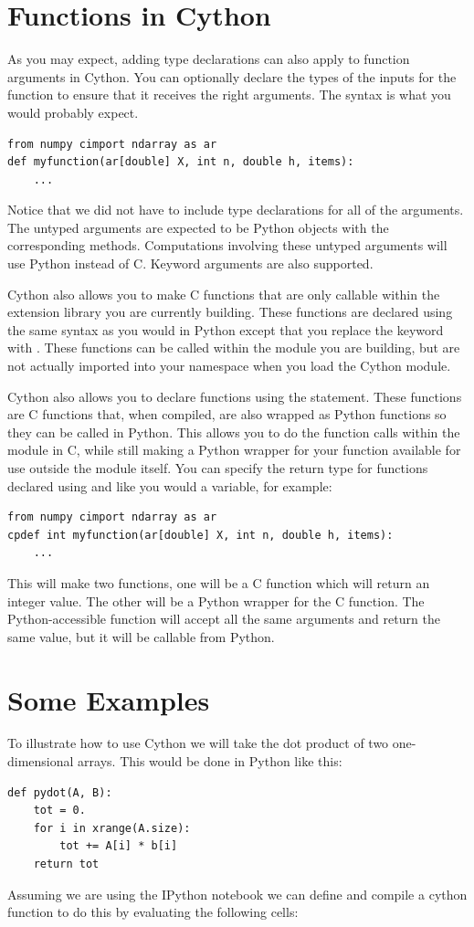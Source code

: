 \section*{Functions in Cython}
As you may expect, adding type declarations can also apply to function arguments in Cython.
You can optionally declare the types of the inputs for the function to ensure that it receives the right arguments.
The syntax is what you would probably expect.
\begin{lstlisting}
from numpy cimport ndarray as ar
def myfunction(ar[double] X, int n, double h, items):
    ...
\end{lstlisting}
Notice that we did not have to include type declarations for all of the arguments.
The untyped arguments are expected to be Python objects with the corresponding methods.
Computations involving these untyped arguments will use Python instead of C.
Keyword arguments are also supported.

Cython also allows you to make C functions that are only callable within the extension library you are currently building.
These functions are declared using the same syntax as you would in Python except that you replace the keyword  with .
These functions can be called within the module you are building, but are not actually imported into your namespace when you load the Cython module.

Cython also allows you to declare functions using the  statement.
These functions are C functions that, when compiled, are also wrapped as Python functions so they can be called in Python.
This allows you to do the function calls within the module in C, while still making a Python wrapper for your function available for use outside the module itself.
You can specify the return type for functions declared using  and  like you would a variable, for example:
\begin{lstlisting}
from numpy cimport ndarray as ar
cpdef int myfunction(ar[double] X, int n, double h, items):
    ...
\end{lstlisting}
This will make two functions, one will be a C function which will return an integer value.
The other will be a Python wrapper for the C function.
The Python-accessible function will accept all the same arguments and return the same value, but it will be callable from Python.

\section*{Some Examples}
To illustrate how to use Cython we will take the dot product of two one-dimensional arrays.
This would be done in Python like this:
\begin{lstlisting}
def pydot(A, B):
    tot = 0.
    for i in xrange(A.size):
        tot += A[i] * b[i]
    return tot
\end{lstlisting}
Assuming we are using the IPython notebook we can define and compile a cython function to do this by evaluating the following cells:

